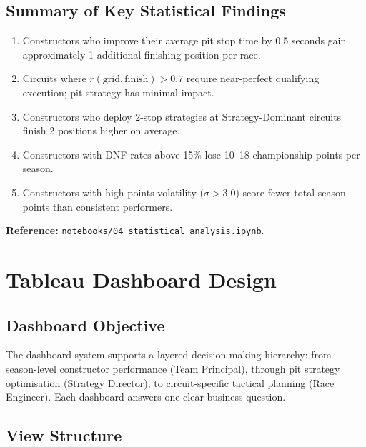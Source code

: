 \documentclass[12pt, a4paper]{article}
\begin{document}
\subsection{Summary of Key Statistical Findings}
\begin{enumerate}
    \item Constructors who improve their average pit stop time by 0.5 seconds gain approximately 1 additional finishing position per race.
    \item Circuits where $r(\text{grid}, \text{finish}) > 0.7$ require near-perfect qualifying execution; pit strategy has minimal impact.
    \item Constructors who deploy 2-stop strategies at Strategy-Dominant circuits finish 2 positions higher on average.
    \item Constructors with DNF rates above 15\% lose 10--18 championship points per season.
    \item Constructors with high points volatility ($\sigma > 3.0$) score fewer total season points than consistent performers.
\end{enumerate}

\textbf{Reference:} \texttt{notebooks/04\_statistical\_analysis.ipynb}.

\newpage

\section{Tableau Dashboard Design}

\subsection{Dashboard Objective}
The dashboard system supports a layered decision-making hierarchy: from season-level constructor performance (Team Principal), through pit strategy optimisation (Strategy Director), to circuit-specific tactical planning (Race Engineer). Each dashboard answers one clear business question.

\subsection{View Structure}
\end{document}
